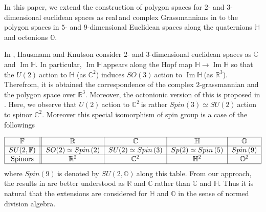 \documentclass[a4paper]{article}%
\begin{document}
In this paper, we extend the construction of polygon spaces for $2$- and
$3$-dimensional euclidean spaces as real$\mathbb{\ }$and complex Grassmannians
in \cite{HK} to the polygon spaces in $5$- and $9$-dimensional Euclidean
spaces along the quaternions $\mathbb{H\ }$and octonions $\mathbb{O}$.

In \cite{HK}, Hausmann and Knutson consider $2$- and $3$-dimensional euclidean
spaces as $\mathbb{C}$ and $\operatorname{Im}\mathbb{H}$. In particular,
$\operatorname{Im}\mathbb{H\ }$appears along the Hopf map $\mathbb{H}%
\rightarrow\operatorname{Im}\mathbb{H}$ so that the $U\left(  2\right)
\ $action to $\mathbb{H}$ (as $\mathbb{C}^{2}$) induces $SO\left(  3\right)
\ $action to $\operatorname{Im}\mathbb{H~}$(as $\mathbb{R}^{3}$). Therefrom,
it is obtained the correspondence of the complex $2$-grassmannian and the
polygon space over $\mathbb{R}^{3}$. Moreover, the octonionic version of this
is proposed in \cite{HK}. Here, we observe that $U\left(  2\right)  \ $action
to $\mathbb{C}^{2}\ $is rather $Spin\left(  3\right)  \simeq SU\left(
2\right)  \ $action to spinor $\mathbb{C}^{2}$. Moreover this special
isomorphism of spin group is a case of the followings%

\[%
\begin{tabular}
[c]{|c||c|c|c|c|}\hline
$\mathbb{F}$ & $\mathbb{R}$ & $\mathbb{C}$ & $\mathbb{H}$ & $\mathbb{O}%
$\\\hline
$SU(2,\mathbb{F})$ & $SO(2)\simeq Spin\left(  2\right)  $ & $SU(2)\simeq
Spin\left(  3\right)  $ & $Sp(2)\simeq Spin\left(  5\right)  $ & $Spin\left(
9\right)  $\\\hline
Spinors & $\mathbb{R}^{2}$ & $\mathbb{C}^{2}$ & $\mathbb{H}^{2}$ &
$\mathbb{O}^{2}$\\\hline
\end{tabular}
\]
where $Spin\left(  9\right)  \ $is denoted by $SU(2,\mathbb{O})\mathbb{\ }%
$along this table. From our approach, the results in \cite{HK} are better
understood as $\mathbb{R}$ and $\mathbb{C\ }$rather than $\mathbb{C}$ and
$\mathbb{H}$. Thus it is natural that the extensions are considered for
$\mathbb{H}$ and $\mathbb{O}$ in the sense of normed division algebra.
\end{document}

